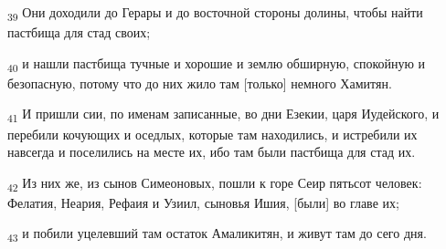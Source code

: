 \begin{tcolorbox}
\textsubscript{39} Они доходили до Герары и до восточной стороны долины, чтобы найти пастбища для стад своих;
\end{tcolorbox}
\begin{tcolorbox}
\textsubscript{40} и нашли пастбища тучные и хорошие и землю обширную, спокойную и безопасную, потому что до них жило там [только] немного Хамитян.
\end{tcolorbox}
\begin{tcolorbox}
\textsubscript{41} И пришли сии, по именам записанные, во дни Езекии, царя Иудейского, и перебили кочующих и оседлых, которые там находились, и истребили их навсегда и поселились на месте их, ибо там были пастбища для стад их.
\end{tcolorbox}
\begin{tcolorbox}
\textsubscript{42} Из них же, из сынов Симеоновых, пошли к горе Сеир пятьсот человек: Фелатия, Неария, Рефаия и Узиил, сыновья Ишия, [были] во главе их;
\end{tcolorbox}
\begin{tcolorbox}
\textsubscript{43} и побили уцелевший там остаток Амаликитян, и живут там до сего дня.
\end{tcolorbox}

